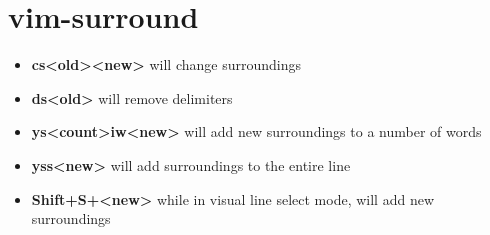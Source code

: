 \documentclass{article}
\begin{document}
\section{vim-surround}
\begin{itemize}
	\item \textbf{cs<old><new>} will change surroundings 
	\item \textbf{ds<old>} will remove delimiters 
	\item \textbf{ys<count>iw<new>} will add new surroundings to a number of words 
	\item \textbf{yss<new>} will add surroundings to the entire line 
	\item \textbf{Shift+S+<new>} while in visual line select mode, will add new surroundings
\end{itemize}
\end{document}
